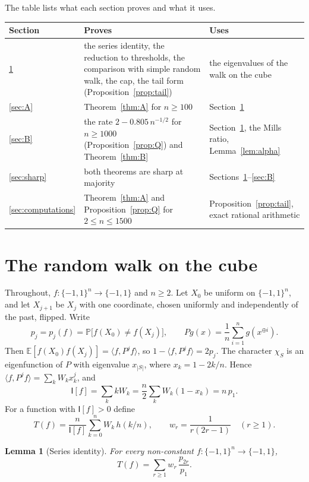 \documentclass[11pt]{amsart}
\newtheorem{lemma}{Lemma}[section]
\theoremstyle{remark}
\newcommand{\bits}{\{-1,1\}}
\newcommand{\E}{\mathbb E}
\renewcommand{\P}{\mathbb P}
\newcommand{\I}{\mathsf I}
\begin{document}
The table lists what each section proves and what it uses.

\begin{center}
\small
\begin{tabular}{@{}lp{}p{}@{}}
\toprule
Section & Proves & Uses\\
\midrule
\ref{sec:walk} & the series identity, the reduction to thresholds, the comparison with simple random walk, the cap, the tail form (Proposition~\ref{prop:tail}) & the eigenvalues of the walk on the cube\\
\ref{sec:A} & Theorem~\ref{thm:A} for $n\ge100$ & Section~\ref{sec:walk}\\
\ref{sec:B} & the rate $2-0.805\,n^{-1/2}$ for $n\ge1000$ (Proposition~\ref{prop:Q}) and Theorem~\ref{thm:B} & Section~\ref{sec:walk}, the Mills ratio, Lemma~\ref{lem:alpha}\\
\ref{sec:sharp} & both theorems are sharp at majority & Sections~\ref{sec:walk}--\ref{sec:B}\\
\ref{sec:computations} & Theorem~\ref{thm:A} and Proposition~\ref{prop:Q} for $2\le n\le1500$ & Proposition~\ref{prop:tail}, exact rational arithmetic\\
\bottomrule
\end{tabular}
\end{center}

\section{The random walk on the cube}\label{sec:walk}

Throughout, $f:\bits^n\to\bits$ and $n\ge2$. Let $X_0$ be uniform on $\bits^n$, and let $X_{j+1}$ be $X_j$ with one coordinate, chosen uniformly and independently of the past, flipped. Write
\[
 p_j=p_j(f)=\P\bigl[f(X_0)\ne f(X_j)\bigr],\qquad Pg(x)=\frac1n\sum_{i=1}^ng(x^{\oplus i}).
\]
Then $\E[f(X_0)f(X_j)]=\langle f,P^jf\rangle$, so $1-\langle f,P^jf\rangle=2p_j$. The character $\chi_S$ is an eigenfunction of $P$ with eigenvalue $x_{|S|}$, where $x_k=1-2k/n$. Hence $\langle f,P^jf\rangle=\sum_kW_kx_k^j$, and
\begin{equation}\label{eq:I}
 \I[f]=\sum_kkW_k=\frac n2\sum_kW_k(1-x_k)=n\,p_1.
\end{equation}
For a function with $\I[f]>0$ define
\[
 T(f)=\frac{n}{\I[f]}\sum_{k=0}^nW_k\,h(k/n),\qquad w_r=\frac1{r(2r-1)}\quad(r\ge1).
\]

\begin{lemma}[Series identity]\label{lem:series}
For every non-constant $f:\bits^n\to\bits$,
\[
 T(f)=\sum_{r\ge1}w_r\,\frac{p_{2r}}{p_1}.
\]
\end{lemma}
\end{document}
